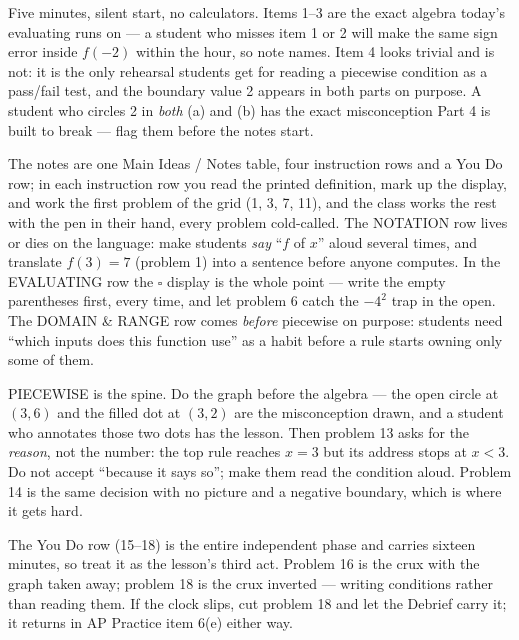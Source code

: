 \documentclass[10pt]{article}
\begin{document}
\begin{teachernote}[Warm-Up]
Five minutes, silent start, no calculators. Items 1--3 are the exact algebra
today's evaluating runs on --- a student who misses item 1 or 2 will make the
same sign error inside $f(-2)$ within the hour, so note names. Item 4 looks
trivial and is not: it is the only rehearsal students get for reading a piecewise
condition as a pass/fail test, and the boundary value 2 appears in both parts on
purpose. A student who circles 2 in \emph{both} (a) and (b) has the exact
misconception Part 4 is built to break --- flag them before the notes start.
\end{teachernote}

\begin{teachernote}
The notes are one Main Ideas / Notes table, four instruction rows and a You Do
row; in each instruction row you read the printed definition, mark up the
display, and work the first problem of the grid (1, 3, 7, 11), and the class
works the rest with the pen in their hand, every problem cold-called. The
NOTATION row lives or dies on the language: make students \textit{say} ``$f$ of
$x$'' aloud several times, and translate $f(3) = 7$ (problem 1) into a sentence
before anyone computes. In the EVALUATING row the $\square$ display is the whole
point --- write the empty parentheses first, every time, and let problem 6 catch
the $-4^2$ trap in the open. The DOMAIN \& RANGE row comes \textit{before}
piecewise on purpose: students need ``which inputs does this function use'' as a
habit before a rule starts owning only some of them.

PIECEWISE is the spine. Do the graph before the algebra --- the open circle at
$(3,6)$ and the filled dot at $(3,2)$ are the misconception drawn, and a student
who annotates those two dots has the lesson. Then problem 13 asks for the
\emph{reason}, not the number: the top rule reaches $x = 3$ but its address stops
at $x < 3$. Do not accept ``because it says so''; make them read the condition
aloud. Problem 14 is the same decision with no picture and a negative boundary,
which is where it gets hard.

The You Do row (15--18) is the entire independent phase and carries sixteen
minutes, so treat it as the lesson's third act. Problem 16 is the crux with the
graph taken away; problem 18 is the crux inverted --- writing conditions rather
than reading them. If the clock slips, cut problem 18 and let the Debrief carry
it; it returns in AP Practice item 6(e) either way.
\end{teachernote}
\end{document}
